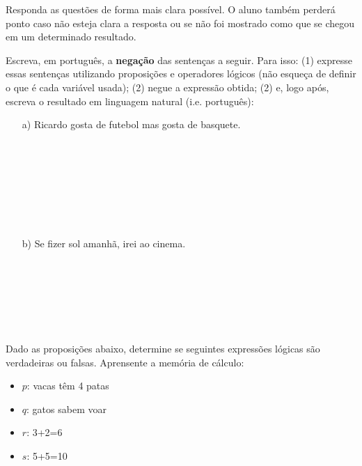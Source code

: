 \documentclass[16pt]{examdesign}
\begin{document}
\begin{fillin}[title={},
                    rearrange=no,resetcounter=no,suppressprefix]
\pagebreak
          Responda as questões de forma mais clara possível.
          O aluno também perderá ponto caso não esteja clara a resposta ou se não foi mostrado como que se chegou em um determinado resultado.
    \begin{question}
     [4 pontos] Escreva, em português, a \textbf{negação} das sentenças a seguir. Para isso: (1) expresse essas sentenças utilizando proposições e operadores lógicos (não esqueça de definir o que é cada variável usada); (2) negue a expressão obtida;  (2) e, logo após, escreva o resultado em linguagem natural (i.e. português):
     \begin{itemize}
	    \item[a)] Ricardo gosta de futebol mas gosta de basquete.\\~\\
	    ~\\
	    ~\\
	    ~\\
	    ~\\
	    ~\\
	    ~\\
	    
	    \item[b)] Se fizer sol amanhã, irei ao cinema.\\~\\
	    ~\\
	    ~\\
	    ~\\
	    ~\\
	    ~\\
	    \end{itemize}
    \end{question}
 \begin{question}
      [5 pontos] Dado as proposições abaixo, determine se seguintes expressões lógicas são verdadeiras ou falsas. Aprensente a memória de cálculo:
      
      \begin{multicols}{2}[]
	    \begin{itemize}
	    \item $p$: vacas têm 4 patas
	    \item $q$: gatos  sabem voar
	    \item $r$: 3+2=6
	    \item $s$: 5+5=10
	    \end{itemize}
      \end{multicols}
      

\end{question}
\end{fillin}
\end{document}
